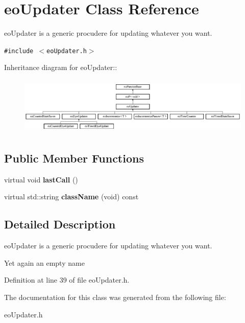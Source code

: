 \section{eo\-Updater Class Reference}
\label{classeo_updater}
eo\-Updater is a generic procudere for updating whatever you want.  


{\tt \#include $<$eo\-Updater.h$>$}

Inheritance diagram for eo\-Updater::\begin{figure}[H]
\begin{center}
\leavevmode
\includegraphics[height=2.77778cm]{classeo_updater}
\end{center}
\end{figure}
\subsection*{Public Member Functions}
\begin{CompactItemize}
\item 
virtual void {\bf last\-Call} ()\label{classeo_updater_a0}

\item 
virtual std::string {\bf class\-Name} (void) const \label{classeo_updater_a1}

\end{CompactItemize}


\subsection{Detailed Description}
eo\-Updater is a generic procudere for updating whatever you want. 

Yet again an empty name 



Definition at line 39 of file eo\-Updater.h.

The documentation for this class was generated from the following file:\begin{CompactItemize}
\item 
eo\-Updater.h\end{CompactItemize}
